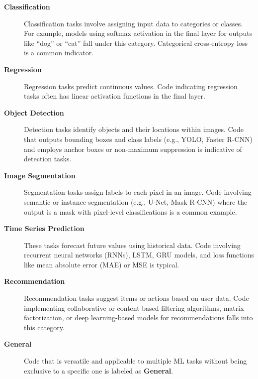 \begin{description}

    \item [\textbf{Classification}]Classification tasks involve assigning input data to categories or classes. For example, models using softmax activation in the final layer for outputs like ``dog'' or ``cat'' fall under this category. Categorical cross-entropy loss is a common indicator.

    \item [\textbf{Regression}]Regression tasks predict continuous values. Code indicating regression tasks often has linear activation functions in the final layer.

    \item [\textbf{Object Detection}]Detection tasks identify objects and their locations within images. Code that outputs bounding boxes and class labels (e.g., YOLO, Faster R-CNN) and employs anchor boxes or non-maximum suppression is indicative of detection tasks.

    \item [\textbf{Image Segmentation}]Segmentation tasks assign labels to each pixel in an image. Code involving semantic or instance segmentation (e.g., U-Net, Mask R-CNN) where the output is a mask with pixel-level classifications is a common example.

    \item [\textbf{Time Series Prediction}]These tasks forecast future values using historical data. Code involving recurrent neural networks (RNNs), LSTM, GRU models, and loss functions like mean absolute error (MAE) or MSE is typical.

    \item [\textbf{Recommendation}]Recommendation tasks suggest items or actions based on user data. Code implementing collaborative or content-based filtering algorithms, matrix factorization, or deep learning-based models for recommendations falls into this category.

    \item [\textbf{General}]Code that is versatile and applicable to multiple ML tasks without being exclusive to a specific one is labeled as \textbf{General}.

\end{description}

    


